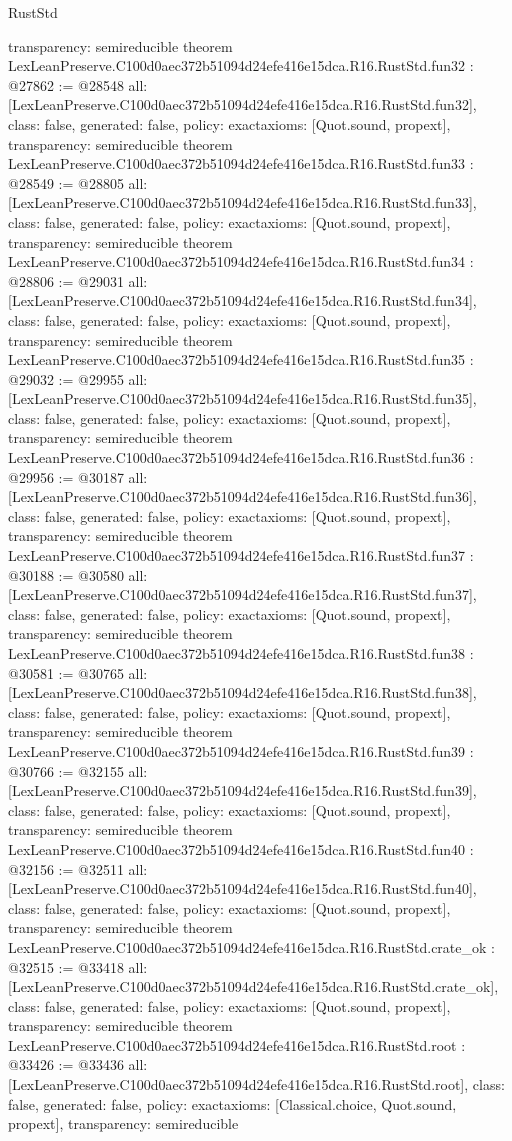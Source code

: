 \begin{lexlean}{RustStd}
\begin{coremodule}
{  transparency: semireducible
}
theorem LexLeanPreserve.C100d0aec372b51094d24efe416e15dca.R16.RustStd.fun32 : @27862 := @28548 {
  all: [LexLeanPreserve.C100d0aec372b51094d24efe416e15dca.R16.RustStd.fun32],
  class: false,
  generated: false,
  policy: exact{axioms: [Quot.sound, propext]},
  transparency: semireducible
}
theorem LexLeanPreserve.C100d0aec372b51094d24efe416e15dca.R16.RustStd.fun33 : @28549 := @28805 {
  all: [LexLeanPreserve.C100d0aec372b51094d24efe416e15dca.R16.RustStd.fun33],
  class: false,
  generated: false,
  policy: exact{axioms: [Quot.sound, propext]},
  transparency: semireducible
}
theorem LexLeanPreserve.C100d0aec372b51094d24efe416e15dca.R16.RustStd.fun34 : @28806 := @29031 {
  all: [LexLeanPreserve.C100d0aec372b51094d24efe416e15dca.R16.RustStd.fun34],
  class: false,
  generated: false,
  policy: exact{axioms: [Quot.sound, propext]},
  transparency: semireducible
}
theorem LexLeanPreserve.C100d0aec372b51094d24efe416e15dca.R16.RustStd.fun35 : @29032 := @29955 {
  all: [LexLeanPreserve.C100d0aec372b51094d24efe416e15dca.R16.RustStd.fun35],
  class: false,
  generated: false,
  policy: exact{axioms: [Quot.sound, propext]},
  transparency: semireducible
}
theorem LexLeanPreserve.C100d0aec372b51094d24efe416e15dca.R16.RustStd.fun36 : @29956 := @30187 {
  all: [LexLeanPreserve.C100d0aec372b51094d24efe416e15dca.R16.RustStd.fun36],
  class: false,
  generated: false,
  policy: exact{axioms: [Quot.sound, propext]},
  transparency: semireducible
}
theorem LexLeanPreserve.C100d0aec372b51094d24efe416e15dca.R16.RustStd.fun37 : @30188 := @30580 {
  all: [LexLeanPreserve.C100d0aec372b51094d24efe416e15dca.R16.RustStd.fun37],
  class: false,
  generated: false,
  policy: exact{axioms: [Quot.sound, propext]},
  transparency: semireducible
}
theorem LexLeanPreserve.C100d0aec372b51094d24efe416e15dca.R16.RustStd.fun38 : @30581 := @30765 {
  all: [LexLeanPreserve.C100d0aec372b51094d24efe416e15dca.R16.RustStd.fun38],
  class: false,
  generated: false,
  policy: exact{axioms: [Quot.sound, propext]},
  transparency: semireducible
}
theorem LexLeanPreserve.C100d0aec372b51094d24efe416e15dca.R16.RustStd.fun39 : @30766 := @32155 {
  all: [LexLeanPreserve.C100d0aec372b51094d24efe416e15dca.R16.RustStd.fun39],
  class: false,
  generated: false,
  policy: exact{axioms: [Quot.sound, propext]},
  transparency: semireducible
}
theorem LexLeanPreserve.C100d0aec372b51094d24efe416e15dca.R16.RustStd.fun40 : @32156 := @32511 {
  all: [LexLeanPreserve.C100d0aec372b51094d24efe416e15dca.R16.RustStd.fun40],
  class: false,
  generated: false,
  policy: exact{axioms: [Quot.sound, propext]},
  transparency: semireducible
}
theorem LexLeanPreserve.C100d0aec372b51094d24efe416e15dca.R16.RustStd.crate_ok : @32515 := @33418 {
  all: [LexLeanPreserve.C100d0aec372b51094d24efe416e15dca.R16.RustStd.crate_ok],
  class: false,
  generated: false,
  policy: exact{axioms: [Quot.sound, propext]},
  transparency: semireducible
}
theorem LexLeanPreserve.C100d0aec372b51094d24efe416e15dca.R16.RustStd.root : @33426 := @33436 {
  all: [LexLeanPreserve.C100d0aec372b51094d24efe416e15dca.R16.RustStd.root],
  class: false,
  generated: false,
  policy: exact{axioms: [Classical.choice, Quot.sound, propext]},
  transparency: semireducible
}


\end{coremodule}
\end{lexlean}
